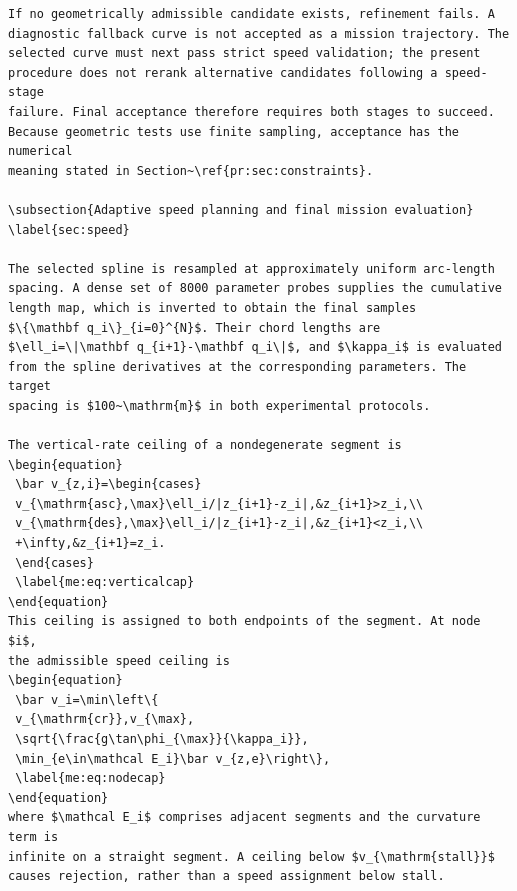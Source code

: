 \documentclass[12pt]{article}
\begin{document}
\begin{verbatim}
If no geometrically admissible candidate exists, refinement fails. A
diagnostic fallback curve is not accepted as a mission trajectory. The
selected curve must next pass strict speed validation; the present
procedure does not rerank alternative candidates following a speed-stage
failure. Final acceptance therefore requires both stages to succeed.
Because geometric tests use finite sampling, acceptance has the numerical
meaning stated in Section~\ref{pr:sec:constraints}.

\subsection{Adaptive speed planning and final mission evaluation}
\label{sec:speed}

The selected spline is resampled at approximately uniform arc-length
spacing. A dense set of 8000 parameter probes supplies the cumulative
length map, which is inverted to obtain the final samples
$\{\mathbf q_i\}_{i=0}^{N}$. Their chord lengths are
$\ell_i=\|\mathbf q_{i+1}-\mathbf q_i\|$, and $\kappa_i$ is evaluated
from the spline derivatives at the corresponding parameters. The target
spacing is $100~\mathrm{m}$ in both experimental protocols.

The vertical-rate ceiling of a nondegenerate segment is
\begin{equation}
 \bar v_{z,i}=\begin{cases}
 v_{\mathrm{asc},\max}\ell_i/|z_{i+1}-z_i|,&z_{i+1}>z_i,\\
 v_{\mathrm{des},\max}\ell_i/|z_{i+1}-z_i|,&z_{i+1}<z_i,\\
 +\infty,&z_{i+1}=z_i.
 \end{cases}
 \label{me:eq:verticalcap}
\end{equation}
This ceiling is assigned to both endpoints of the segment. At node $i$,
the admissible speed ceiling is
\begin{equation}
 \bar v_i=\min\left\{
 v_{\mathrm{cr}},v_{\max},
 \sqrt{\frac{g\tan\phi_{\max}}{\kappa_i}},
 \min_{e\in\mathcal E_i}\bar v_{z,e}\right\},
 \label{me:eq:nodecap}
\end{equation}
where $\mathcal E_i$ comprises adjacent segments and the curvature term is
infinite on a straight segment. A ceiling below $v_{\mathrm{stall}}$
causes rejection, rather than a speed assignment below stall.


\end{verbatim}
\end{document}
